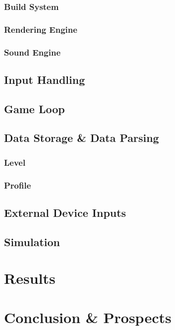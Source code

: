 \documentclass[11pt]{article}
\begin{document}
    \subsubsection{Build System}
    \subsubsection{Rendering Engine}
    \subsubsection{Sound Engine}
    \subsection{Input Handling}
    \subsection{Game Loop}
    \subsection{Data Storage \& Data Parsing}
    \subsubsection{Level}
    \subsubsection{Profile}
    \subsection{External Device Inputs}
    \subsection{Simulation}
    \section{Results}
    \section{Conclusion \& Prospects}
\end{document}
